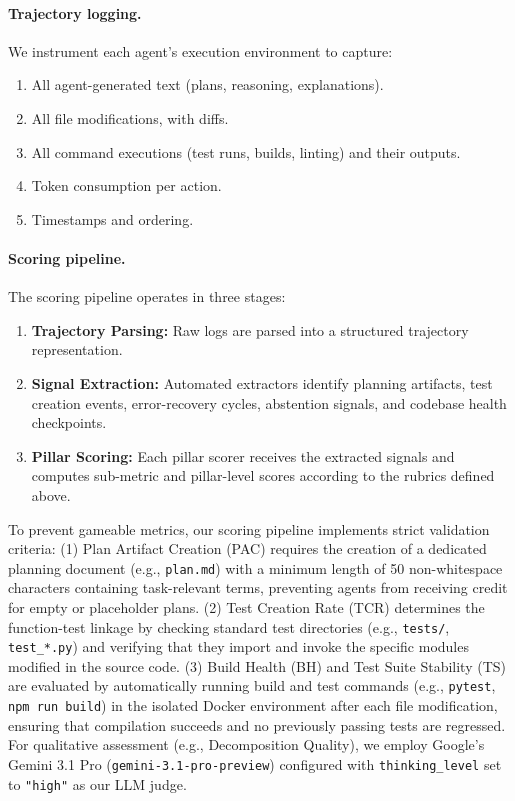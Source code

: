 \documentclass[letterpaper, 10 pt, conference]{ieeeconf}
\begin{document}
\paragraph{Trajectory logging.}
We instrument each agent's execution environment to capture:
\begin{enumerate}[leftmargin=*,itemsep=1pt]
  \item All agent-generated text (plans, reasoning, explanations).
  \item All file modifications, with diffs.
  \item All command executions (test runs, builds, linting) and their outputs.
  \item Token consumption per action.
  \item Timestamps and ordering.
\end{enumerate}

\paragraph{Scoring pipeline.}
The scoring pipeline operates in three stages:
\begin{enumerate}[leftmargin=*,itemsep=1pt]
  \item \textbf{Trajectory Parsing:} Raw logs are parsed into a structured trajectory representation.
  \item \textbf{Signal Extraction:} Automated extractors identify planning artifacts, test creation events, error-recovery cycles, abstention signals, and codebase health checkpoints.
  \item \textbf{Pillar Scoring:} Each pillar scorer receives the extracted signals and computes sub-metric and pillar-level scores according to the rubrics defined above.
\end{enumerate}

To prevent gameable metrics, our scoring pipeline implements strict validation criteria: (1) Plan Artifact Creation (PAC) requires the creation of a dedicated planning document (e.g., \texttt{plan.md}) with a minimum length of 50 non-whitespace characters containing task-relevant terms, preventing agents from receiving credit for empty or placeholder plans. (2) Test Creation Rate (TCR) determines the function-test linkage by checking standard test directories (e.g., \texttt{tests/}, \texttt{test\_*.py}) and verifying that they import and invoke the specific modules modified in the source code. (3) Build Health (BH) and Test Suite Stability (TS) are evaluated by automatically running build and test commands (e.g., \texttt{pytest}, \texttt{npm run build}) in the isolated Docker environment after each file modification, ensuring that compilation succeeds and no previously passing tests are regressed. For qualitative assessment (e.g., Decomposition Quality), we employ Google's Gemini 3.1 Pro (\texttt{gemini-3.1-pro-preview}) configured with \texttt{thinking\_level} set to \texttt{"high"} as our LLM judge.
\end{document}
